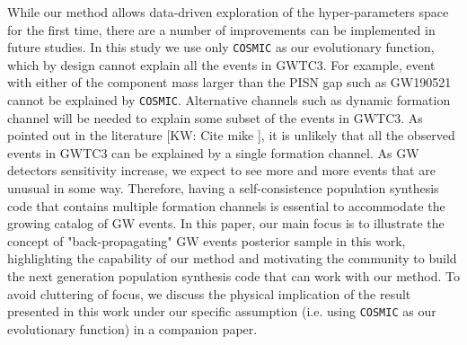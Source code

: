 \documentclass[twocolumn]{aastex631}
\newcommand{\kw}[1]{{\color{rb4}[KW: #1 ]}}
\begin{document}
While our method allows data-driven exploration of the hyper-parameters space for the first time, there are a number of improvements can be implemented in future studies.
In this study we use only \texttt{COSMIC} as our evolutionary function, which by design cannot explain all the events in GWTC3.
For example, event with either of the component mass larger than the PISN gap such as GW190521 cannot be explained by \texttt{COSMIC}.
Alternative channels such as dynamic formation channel will be needed to explain some subset of the events in GWTC3.
As pointed out in the literature \kw{Cite mike}, it is unlikely that all the observed events in GWTC3 can be explained by a single formation channel.
As GW detectors sensitivity increase, we expect to see more and more events that are unusual in some way.
Therefore, having a self-consistence population synthesis code that contains multiple formation channels is essential to accommodate the growing catalog of GW events.
In this paper, our main focus is to illustrate the concept of "back-propagating" GW events posterior sample in this work,
highlighting the capability of our method and motivating the community to build the next generation population synthesis code that can work with our method.
To avoid cluttering of focus, we discuss the physical implication of the result presented in this work under our specific assumption (i.e. using \texttt{COSMIC} as our evolutionary function) in a companion paper.
\end{document}
